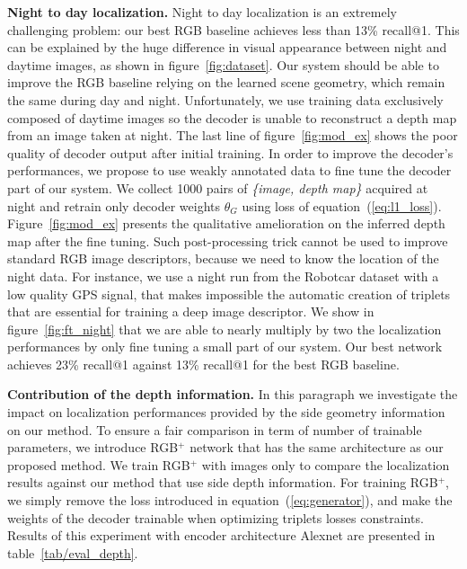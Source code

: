 \vspace{4pt}\noindent\textbf{Night to day localization.} Night to day localization is an extremely challenging problem: our best RGB baseline achieves less than 13\% recall@1. This can be explained by the huge difference in visual appearance between night and daytime images, as shown in figure~\ref{fig:dataset}. Our system should be able to improve the RGB baseline relying on the learned scene geometry, which remain the same during day and night. Unfortunately, we use training data exclusively composed of daytime images so the decoder is unable to reconstruct a depth map from an image taken at night. The last line of figure~\ref{fig:mod_ex} shows the poor quality of decoder output after initial training. In order to improve the decoder's performances, we propose to use weakly annotated data to fine tune the decoder part of our system. We collect 1000 pairs of \textit{\{image, depth map\}} acquired at night and retrain only decoder weights $\theta_G$ using loss of equation~(\ref{eq:l1_loss}). Figure~\ref{fig:mod_ex} presents the qualitative amelioration on the inferred depth map after the fine tuning. Such post-processing trick cannot be used to improve standard RGB image descriptors, because we need to know the location of the night data. For instance, we use a night run from the Robotcar dataset with a low quality GPS signal, that makes impossible the automatic creation of triplets that are essential for training a deep image descriptor. We show in figure~\ref{fig:ft_night} that we are able to nearly multiply by two the localization performances by only fine tuning a small part of our system. Our best network achieves 23\% recall@1 against 13\% recall@1 for the best RGB baseline.

\vspace{4pt}\noindent\textbf{Contribution of the depth information.} In this paragraph we investigate the impact on localization performances provided by the side geometry information on our method. To ensure a fair comparison in term of number of trainable parameters, we introduce RGB$^+$ network that has the same architecture as our proposed method. We train RGB$^+$ with images only to compare the localization results against our method that use side depth information. For training RGB$^+$, we simply remove the loss introduced in equation~(\ref{eq:generator}), and make the weights of the decoder trainable when optimizing triplets losses constraints. Results of this experiment with encoder architecture Alexnet are presented in table~\ref{tab/eval_depth}.

